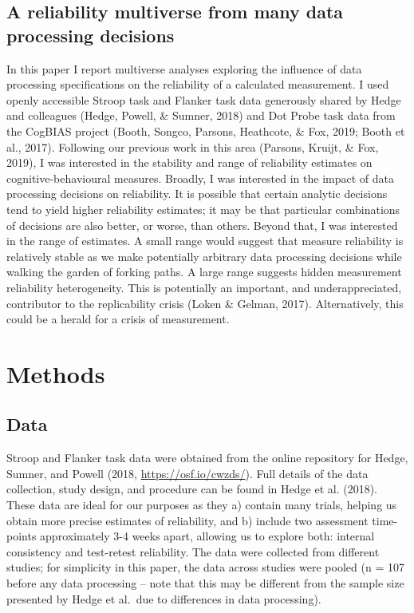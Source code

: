 \documentclass[
  english,
  man,floatsintext]{apa6}
\begin{document}
\hypertarget{a-reliability-multiverse-from-many-data-processing-decisions}{%
\subsection{A reliability multiverse from many data processing decisions}\label{a-reliability-multiverse-from-many-data-processing-decisions}}

In this paper I report multiverse analyses exploring the influence of data processing specifications on the reliability of a calculated measurement. I used openly accessible Stroop task and Flanker task data generously shared by Hedge and colleagues (Hedge, Powell, \& Sumner, 2018) and Dot Probe task data from the CogBIAS project (Booth, Songco, Parsons, Heathcote, \& Fox, 2019; Booth et al., 2017). Following our previous work in this area (Parsons, Kruijt, \& Fox, 2019), I was interested in the stability and range of reliability estimates on cognitive-behavioural measures. Broadly, I was interested in the impact of data processing decisions on reliability. It is possible that certain analytic decisions tend to yield higher reliability estimates; it may be that particular combinations of decisions are also better, or worse, than others. Beyond that, I was interested in the range of estimates. A small range would suggest that measure reliability is relatively stable as we make potentially arbitrary data processing decisions while walking the garden of forking paths. A large range suggests hidden measurement reliability heterogeneity. This is potentially an important, and underappreciated, contributor to the replicability crisis (Loken \& Gelman, 2017). Alternatively, this could be a herald for a crisis of measurement.

\hypertarget{methods}{%
\section{Methods}\label{methods}}

\hypertarget{data}{%
\subsection{Data}\label{data}}

Stroop and Flanker task data were obtained from the online repository for Hedge, Sumner, and Powell (2018, \url{https://osf.io/cwzds/}). Full details of the data collection, study design, and procedure can be found in Hedge et al. (2018). These data are ideal for our purposes as they a) contain many trials, helping us obtain more precise estimates of reliability, and b) include two assessment time-points approximately 3-4 weeks apart, allowing us to explore both: internal consistency and test-retest reliability. The data were collected from different studies; for simplicity in this paper, the data across studies were pooled (n = 107 before any data processing -- note that this may be different from the sample size presented by Hedge et al.~due to differences in data processing).
\end{document}
